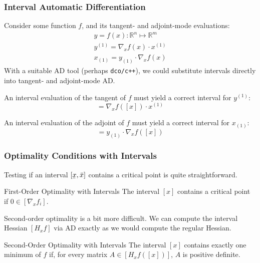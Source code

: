 \documentclass[10pt]{beamer}
\newcommand{\R}{\ensuremath{\mathbb{R}}}
\newcommand\ubar[1]{\underaccent{\bar}{#1}}
\begin{document}
\begin{frame}
	\frametitle{Interval Automatic Differentiation}
	Consider some function $f$, and its tangent- and adjoint-mode evaluations:
	\begin{gather*}
		y = f(x) \colon \R^n\mapsto\R^m\\
		y^{(1)} = \nabla_xf(x)\cdot x^{(1)}\\
		x_{(1)} = y_{(1)}\cdot\nabla_xf(x)
	\end{gather*}
	With a suitable AD tool (perhaps \texttt{dco/c++}\supercite{leppkesDerivativeCodeOverloading2016}), we could substitute intervals directly into tangent- and adjoint-mode AD.
	\vfill
	\begin{minipage}{0.42\columnwidth}
		An interval evaluation of the tangent of $f$ must yield a correct interval for $y^{(1)}$:
		\begin{equation*}
			[y^{(1)}] = \nabla_xf([x])\cdot x^{(1)}
		\end{equation*}
	\end{minipage}
	\hfill
	\begin{minipage}{0.42\columnwidth}
	An interval evaluation of the adjoint of $f$ must yield a correct interval for $x_{(1)}$:
	\begin{equation*}
		[x_{(1)}] = y_{(1)}\cdot\nabla_xf([x])
	\end{equation*}
	\end{minipage}
	\vfill
\end{frame}

\begin{frame}
	\frametitle{Optimality Conditions with Intervals}
	Testing if an interval $[\ubar x, \bar x]$ contains a critical point is quite straightforward.
	\begin{block}{First-Order Optimality with Intervals}
		The interval $[x]$ contains a critical point if $0 \in [\nabla_x f_i]$.
	\end{block}
	\vfill
	Second-order optimality is a bit more difficult. We can compute the interval Hessian $[H_xf]$ via AD exactly as we would compute the regular Hessian.
	\begin{block}{Second-Order Optimality with Intervals}
		The interval $[x]$ contains exactly one minimum of $f$ if, for every matrix $A\in\left[H_xf([x])\right]$, $A$ is positive definite.
	\end{block}
\end{frame}
\end{document}
